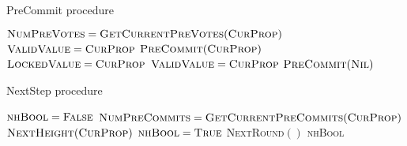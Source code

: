 \begin{algorithm}[p]
\caption{PreCommit procedure}
\label{alg:precommit_proc}
\begin{algorithmic}[1]
    \State $\textsc{NumPreVotes}
        = \textsc{GetCurrentPreVotes}(\textsc{CurProp})$
        \State $\textsc{ValidValue} = \textsc{CurProp}$
            \State $\textsc{PreCommit}(\textsc{CurProp})$
            \State $\textsc{LockedValue} = \textsc{CurProp}$
            \State \Return
        \Else
            \State $\textsc{ValidValue} = \textsc{CurProp}$
        \EndIf
    \EndIf
    \State $\textsc{PreCommit}(\textsc{Nil})$
    \State \Return
\EndFunction
\end{algorithmic}
\end{algorithm}

\begin{algorithm}[p]
\caption{NextStep procedure}
\label{alg:nextstep_proc}
\begin{algorithmic}[1]
    \State $\textsc{nhBool} = \textsc{False}$
    \State $\textsc{NumPreCommits}
        = \textsc{GetCurrentPreCommits}(\textsc{CurProp})$
        \State $\textsc{NextHeight}(\textsc{CurProp})$
        \State $\textsc{nhBool} = \textsc{True}$
    \Else
        \State \textsc{NextRound}$()$
    \EndIf
    \State \Return \textsc{nhBool}
\EndFunction
\end{algorithmic}
\end{algorithm}

